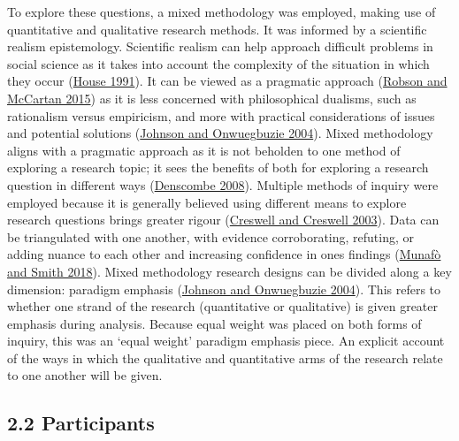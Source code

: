 \documentclass[
]{article}
\begin{document}
To explore these questions, a mixed methodology was employed, making use
of quantitative and qualitative research methods. It was informed by a
scientific realism epistemology. Scientific realism can help approach
difficult problems in social science as it takes into account the
complexity of the situation in which they occur
(\protect\hyperlink{ref-houseRealismResearch1991}{House 1991}). It can
be viewed as a pragmatic approach
(\protect\hyperlink{ref-robsonRealWorldResearch2015}{Robson and McCartan
2015}) as it is less concerned with philosophical dualisms, such as
rationalism versus empiricism, and more with practical considerations of
issues and potential solutions
(\protect\hyperlink{ref-johnsonMixedMethodsResearch2004a}{Johnson and
Onwuegbuzie 2004}). Mixed methodology aligns with a pragmatic approach
as it is not beholden to one method of exploring a research topic; it
sees the benefits of both for exploring a research question in different
ways
(\protect\hyperlink{ref-denscombeCommunitiesPracticeResearch2008}{Denscombe
2008}). Multiple methods of inquiry were employed because it is
generally believed using different means to explore research questions
brings greater rigour
(\protect\hyperlink{ref-creswellResearchDesignQualitative2003a}{Creswell
and Creswell 2003}). Data can be triangulated with one another, with
evidence corroborating, refuting, or adding nuance to each other and
increasing confidence in ones findings
(\protect\hyperlink{ref-munafoRobustResearchNeeds2018}{Munafò and Smith
2018}). Mixed methodology research designs can be divided along a key
dimension: paradigm emphasis
(\protect\hyperlink{ref-johnsonMixedMethodsResearch2004a}{Johnson and
Onwuegbuzie 2004}). This refers to whether one strand of the research
(quantitative or qualitative) is given greater emphasis during analysis.
Because equal weight was placed on both forms of inquiry, this was an
`equal weight' paradigm emphasis piece. An explicit account of the ways
in which the qualitative and quantitative arms of the research relate to
one another will be given.

\hypertarget{participants}{%
\subsection{2.2 Participants}\label{participants}}
\end{document}
